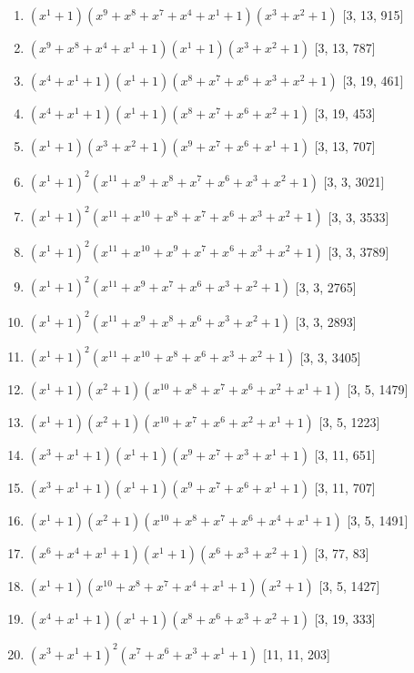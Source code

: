 \documentclass[10pt,twocolumn]{article}
\begin{document}
\begin{enumerate}
\item $(x^{1} + 1)(x^{9} + x^{8} + x^{7} + x^{4} + x^{1} + 1)(x^{3} + x^{2} + 1)$  [3, 13, 915]
\item $(x^{9} + x^{8} + x^{4} + x^{1} + 1)(x^{1} + 1)(x^{3} + x^{2} + 1)$  [3, 13, 787]
\item $(x^{4} + x^{1} + 1)(x^{1} + 1)(x^{8} + x^{7} + x^{6} + x^{3} + x^{2} + 1)$  [3, 19, 461]
\item $(x^{4} + x^{1} + 1)(x^{1} + 1)(x^{8} + x^{7} + x^{6} + x^{2} + 1)$  [3, 19, 453]
\item $(x^{1} + 1)(x^{3} + x^{2} + 1)(x^{9} + x^{7} + x^{6} + x^{1} + 1)$  [3, 13, 707]
\item $(x^{1} + 1)^{2}(x^{11} + x^{9} + x^{8} + x^{7} + x^{6} + x^{3} + x^{2} + 1)$  [3, 3, 3021]
\item $(x^{1} + 1)^{2}(x^{11} + x^{10} + x^{8} + x^{7} + x^{6} + x^{3} + x^{2} + 1)$  [3, 3, 3533]
\item $(x^{1} + 1)^{2}(x^{11} + x^{10} + x^{9} + x^{7} + x^{6} + x^{3} + x^{2} + 1)$  [3, 3, 3789]
\item $(x^{1} + 1)^{2}(x^{11} + x^{9} + x^{7} + x^{6} + x^{3} + x^{2} + 1)$  [3, 3, 2765]
\item $(x^{1} + 1)^{2}(x^{11} + x^{9} + x^{8} + x^{6} + x^{3} + x^{2} + 1)$  [3, 3, 2893]
\item $(x^{1} + 1)^{2}(x^{11} + x^{10} + x^{8} + x^{6} + x^{3} + x^{2} + 1)$  [3, 3, 3405]
\item $(x^{1} + 1)(x^{2} + 1)(x^{10} + x^{8} + x^{7} + x^{6} + x^{2} + x^{1} + 1)$  [3, 5, 1479]
\item $(x^{1} + 1)(x^{2} + 1)(x^{10} + x^{7} + x^{6} + x^{2} + x^{1} + 1)$  [3, 5, 1223]
\item $(x^{3} + x^{1} + 1)(x^{1} + 1)(x^{9} + x^{7} + x^{3} + x^{1} + 1)$  [3, 11, 651]
\item $(x^{3} + x^{1} + 1)(x^{1} + 1)(x^{9} + x^{7} + x^{6} + x^{1} + 1)$  [3, 11, 707]
\item $(x^{1} + 1)(x^{2} + 1)(x^{10} + x^{8} + x^{7} + x^{6} + x^{4} + x^{1} + 1)$  [3, 5, 1491]
\item $(x^{6} + x^{4} + x^{1} + 1)(x^{1} + 1)(x^{6} + x^{3} + x^{2} + 1)$  [3, 77, 83]
\item $(x^{1} + 1)(x^{10} + x^{8} + x^{7} + x^{4} + x^{1} + 1)(x^{2} + 1)$  [3, 5, 1427]
\item $(x^{4} + x^{1} + 1)(x^{1} + 1)(x^{8} + x^{6} + x^{3} + x^{2} + 1)$  [3, 19, 333]
\item $(x^{3} + x^{1} + 1)^{2}(x^{7} + x^{6} + x^{3} + x^{1} + 1)$  [11, 11, 203]

\end{enumerate}
\end{document}
